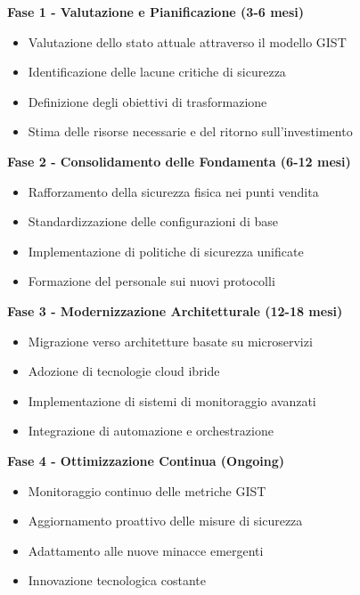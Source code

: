 \begin{tcolorbox}[
    colback=green!5!white,
    colframe=green!75!black,
    title={\textbf{Le Quattro Fasi della Trasformazione}},
    fonttitle=\bfseries,
    boxrule=1pt,
    arc=2mm
]

\textbf{Fase 1 - Valutazione e Pianificazione (3-6 mesi)}
\begin{itemize}
    \item Valutazione dello stato attuale attraverso il modello GIST
    \item Identificazione delle lacune critiche di sicurezza
    \item Definizione degli obiettivi di trasformazione
    \item Stima delle risorse necessarie e del ritorno sull'investimento
\end{itemize}

\textbf{Fase 2 - Consolidamento delle Fondamenta (6-12 mesi)}
\begin{itemize}
    \item Rafforzamento della sicurezza fisica nei punti vendita
    \item Standardizzazione delle configurazioni di base
    \item Implementazione di politiche di sicurezza unificate
    \item Formazione del personale sui nuovi protocolli
\end{itemize}

\textbf{Fase 3 - Modernizzazione Architetturale (12-18 mesi)}
\begin{itemize}
    \item Migrazione verso architetture basate su microservizi
    \item Adozione di tecnologie cloud ibride
    \item Implementazione di sistemi di monitoraggio avanzati
    \item Integrazione di automazione e orchestrazione
\end{itemize}

\textbf{Fase 4 - Ottimizzazione Continua (Ongoing)}
\begin{itemize}
    \item Monitoraggio continuo delle metriche GIST
    \item Aggiornamento proattivo delle misure di sicurezza
    \item Adattamento alle nuove minacce emergenti
    \item Innovazione tecnologica costante
\end{itemize}

\end{tcolorbox}

